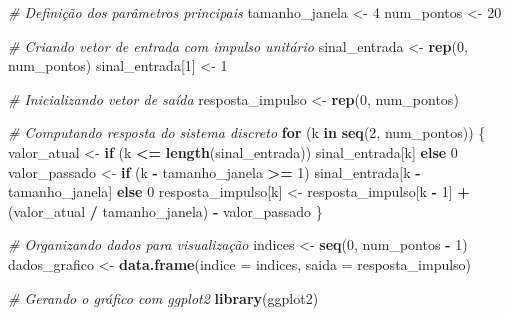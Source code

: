 \documentclass[
]{article}
\newenvironment{Shaded}{\begin{snugshade}}{\end{snugshade}}
\newcommand{\AttributeTok}[1]{\textcolor[rgb]{0.13,0.29,0.53}{#1}}
\newcommand{\CommentTok}[1]{\textcolor[rgb]{0.56,0.35,0.01}{\textit{#1}}}
\newcommand{\ControlFlowTok}[1]{\textcolor[rgb]{0.13,0.29,0.53}{\textbf{#1}}}
\newcommand{\DecValTok}[1]{\textcolor[rgb]{0.00,0.00,0.81}{#1}}
\newcommand{\FunctionTok}[1]{\textcolor[rgb]{0.13,0.29,0.53}{\textbf{#1}}}
\newcommand{\NormalTok}[1]{#1}
\newcommand{\OtherTok}[1]{\textcolor[rgb]{0.56,0.35,0.01}{#1}}
\newcommand{\SpecialCharTok}[1]{\textcolor[rgb]{0.81,0.36,0.00}{\textbf{#1}}}
\begin{document}
\begin{Shaded}
\begin{Highlighting}[]
\CommentTok{\# Definição dos parâmetros principais}
\NormalTok{tamanho\_janela }\OtherTok{\textless{}{-}} \DecValTok{4}
\NormalTok{num\_pontos }\OtherTok{\textless{}{-}} \DecValTok{20}

\CommentTok{\# Criando vetor de entrada com impulso unitário}
\NormalTok{sinal\_entrada }\OtherTok{\textless{}{-}} \FunctionTok{rep}\NormalTok{(}\DecValTok{0}\NormalTok{, num\_pontos)}
\NormalTok{sinal\_entrada[}\DecValTok{1}\NormalTok{] }\OtherTok{\textless{}{-}} \DecValTok{1}

\CommentTok{\# Inicializando vetor de saída}
\NormalTok{resposta\_impulso }\OtherTok{\textless{}{-}} \FunctionTok{rep}\NormalTok{(}\DecValTok{0}\NormalTok{, num\_pontos)}

\CommentTok{\# Computando resposta do sistema discreto}
\ControlFlowTok{for}\NormalTok{ (k }\ControlFlowTok{in} \FunctionTok{seq}\NormalTok{(}\DecValTok{2}\NormalTok{, num\_pontos)) \{}
\NormalTok{  valor\_atual }\OtherTok{\textless{}{-}} \ControlFlowTok{if}\NormalTok{ (k }\SpecialCharTok{\textless{}=} \FunctionTok{length}\NormalTok{(sinal\_entrada)) sinal\_entrada[k] }\ControlFlowTok{else} \DecValTok{0}
\NormalTok{  valor\_passado }\OtherTok{\textless{}{-}} \ControlFlowTok{if}\NormalTok{ (k }\SpecialCharTok{{-}}\NormalTok{ tamanho\_janela }\SpecialCharTok{\textgreater{}=} \DecValTok{1}\NormalTok{) sinal\_entrada[k }\SpecialCharTok{{-}}\NormalTok{ tamanho\_janela] }\ControlFlowTok{else} \DecValTok{0}
\NormalTok{  resposta\_impulso[k] }\OtherTok{\textless{}{-}}\NormalTok{ resposta\_impulso[k }\SpecialCharTok{{-}} \DecValTok{1}\NormalTok{] }\SpecialCharTok{+}\NormalTok{ (valor\_atual }\SpecialCharTok{/}\NormalTok{ tamanho\_janela) }\SpecialCharTok{{-}}\NormalTok{ valor\_passado}
\NormalTok{\}}

\CommentTok{\# Organizando dados para visualização}
\NormalTok{indices }\OtherTok{\textless{}{-}} \FunctionTok{seq}\NormalTok{(}\DecValTok{0}\NormalTok{, num\_pontos }\SpecialCharTok{{-}} \DecValTok{1}\NormalTok{)}
\NormalTok{dados\_grafico }\OtherTok{\textless{}{-}} \FunctionTok{data.frame}\NormalTok{(}\AttributeTok{indice =}\NormalTok{ indices, }\AttributeTok{saida =}\NormalTok{ resposta\_impulso)}

\CommentTok{\# Gerando o gráfico com ggplot2}
\FunctionTok{library}\NormalTok{(ggplot2)}


\end{Highlighting}
\end{Shaded}
\end{document}
